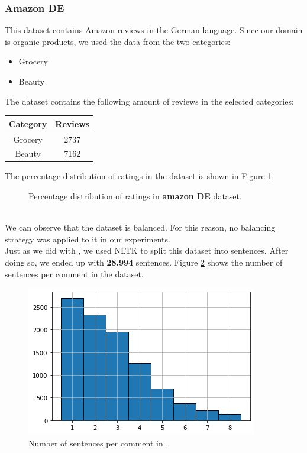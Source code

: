 \subsubsection{Amazon DE}
This dataset contains Amazon reviews in the German language. Since our domain is organic products, we used the data from the two categories:
\begin{itemize}
  \item Grocery
  \item Beauty
\end{itemize}
The dataset contains the following amount of reviews in the selected categories:\\
\begin{center}
 \begin{tabular}{||c c||} 
 \hline
 Category & Reviews\\ [0.4ex] 
 \hline\hline
 Grocery & 2737\\ 
 \hline
 Beauty & 7162\\
 \hline
\end{tabular}
\end{center}
The percentage distribution of ratings in the dataset is shown in Figure \ref{amazon_de_pie_chart}.\\
\begin{figure}[h]
\centering
{}
\caption{Percentage distribution of ratings in {\bf amazon DE} dataset.}
\label{amazon_de_pie_chart}
\end{figure}\\
We can observe that the dataset is balanced. For this reason, no balancing strategy was applied to it in our experiments.\\
Just as we did with \dataEN, we used NLTK to split this dataset into sentences. After doing so, we ended up with {\bf 28.994} sentences. Figure \ref{sentences_per_comment_amazon_de} shows the number of sentences per comment in the dataset.\\
\begin{figure}[h]
\centerline{\includegraphics[scale=.5]{images/sentences_per_comment_amazon_de.png}}
\caption{Number of sentences per comment in \dataDE.}
\label{sentences_per_comment_amazon_de}
\end{figure}
